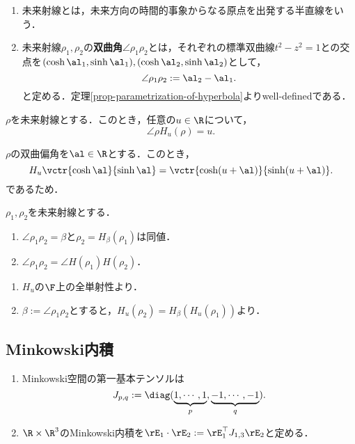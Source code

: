 \documentclass[uplatex,dvipdfmx]{jsreport}
\begin{document}
\begin{definition}\mbox{}
    \begin{enumerate}
        \item 未来射線とは，未来方向の時間的事象からなる原点を出発する半直線をいう．
        \item 未来射線$\rho_1,\rho_2$の\textbf{双曲角}$\angle\rho_1\rho_2$とは，それぞれの標準双曲線$t^2-z^2=1$との交点を$(\cosh\al_1,\sinh\al_1),(\cosh\al_2,\sinh\al_2)$として，
        \[\angle\rho_1\rho_2:=\al_2-\al_1.\]
        と定める．定理\ref{prop-parametrization-of-hyperbola}よりwell-definedである．
    \end{enumerate}
\end{definition}

\begin{theorem}
    $\rho$を未来射線とする．このとき，任意の$u\in\R$について，
    \[\angle\rho H_u(\rho)=u.\]
\end{theorem}
\begin{Proof}
    $\rho$の双曲偏角を$\al\in\R$とする．このとき，
    \[H_u\vctr{\cosh\al}{\sinh\al}=\vctr{\cosh(u+\al)}{\sinh(u+\al)}.\]
    であるため．
\end{Proof}

\begin{corollary}
    $\rho_1,\rho_2$を未来射線とする．
    \begin{enumerate}
        \item $\angle\rho_1\rho_2=\beta$と$\rho_2=H_\beta(\rho_1)$は同値．
        \item $\angle\rho_1\rho_2=\angle H(\rho_1)H(\rho_2)$．
    \end{enumerate}
\end{corollary}
\begin{Proof}\mbox{}
    \begin{enumerate}
        \item $H_u$の$\F$上の全単射性より．
        \item $\beta:=\angle\rho_1\rho_2$とすると，$H_u(\rho_2)=H_\beta(H_u(\rho_1))$より．
    \end{enumerate}
\end{Proof}

\subsection{Minkowski内積}

\begin{definition}\mbox{}
    \begin{enumerate}
        \item Minkowski空間の第一基本テンソルは
        \[J_{p,q}:=\diag(\underbrace{1,\cdots,1}_p,\underbrace{-1,\cdots,-1}_{q}).\]
        \item $\R\times\R^3$のMinkowski内積を$\rE_1\cdot\rE_2:=\rE_1^\top J_{1,3}\rE_2$と定める．
    \end{enumerate}
\end{definition}
\end{document}
